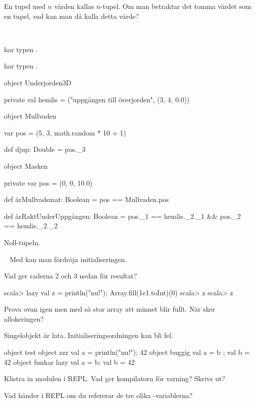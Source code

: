 \Subtask En tupel med $n$ värden kallas $n$-tupel. Om man betraktar det tomma värdet  \code{()} som en tupel, vad kan man då kalla detta värde?

\SOLUTION

\TaskSolved \what~

\SubtaskSolved {} har typen .

\SubtaskSolved {} har typen .


\SubtaskSolved
\begin{Code}
object Underjorden3D {
  private val hemlis = ("uppgången till överjorden", (3, 4, 0.0))

  object Mullvaden {
    var pos = (5, 3, math.random * 10 + 1)

    def djup: Double  = pos._3
  }

  object Masken {
    private var pos = (0, 0, 10.0)

    def ärMullvadsmat: Boolean = pos == Mullvaden.pos

    def ärRaktUnderUppgången: Boolean =
      pos._1 == hemlis._2._1 && pos._2 == hemlis._2._2
  }
}
\end{Code}

\SubtaskSolved Noll-tupeln.

\QUESTEND



\QUESTBEGIN

\Task \what~ Med  kan man fördröja initialiseringen.

\Subtask Vad ger raderna 2 och 3 nedan för resultat?
\begin{REPL}
scala> lazy val z = { println("nu!"); Array.fill(1e1.toInt)(0)}
scala> z
scala> z
\end{REPL}

\Subtask Prova ovan igen men med så stor array att minnet blir fullt. När sker allokeringen?

\Subtask Singelobjekt är lata. Initialiseringsordningen kan bli fel.
\begin{Code}
object test {
  object zzz    { val a = { println("nu!"); 42} }
  object buggig { val a = b ; val b = 42        }
  object funkar { lazy val a = b; val b = 42    }
}
\end{Code}
\noindent Klistra in modulen  i REPL. Vad ger kompilatorn för varning? Skrivs   ut?

\Subtask Vad händer i REPL om du refererar de tre olika -variablerna?

